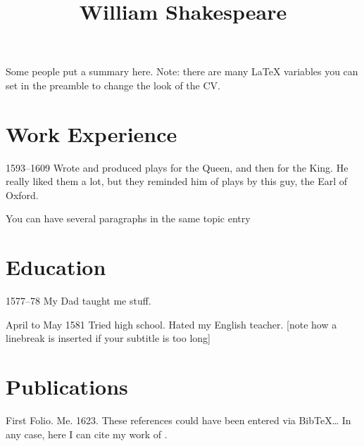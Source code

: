 \documentclass{simplecv}
\begin{document}


\title{William Shakespeare}

\maketitle

Some people put a summary here. Note: there are many \LaTeX{}
variables you can set in the preamble to change the look of the CV.

\section{Work Experience}

\begin{topic}
\item[1593--1609] Wrote and produced plays for the Queen, and then for the
King. He really liked them a lot, but they reminded him of plays by
this guy, the Earl of Oxford.

You can have several paragraphs in the same topic entry
\end{topic}

\section{Education}

\begin{topic}
\item[1577--78] My Dad taught me stuff.
\item[April to May 1581] Tried high school. Hated my English teacher.
[note how a linebreak is inserted if your subtitle is too long]
\end{topic}

\section{Publications}

\begin{thebibliography}{1}
 First Folio. Me. 1623.
 These references could have been entered via
Bib\TeX{}\ldots{} In any case, here I can cite my work of
\cite{firstref}.
\end{thebibliography}
\end{document}
